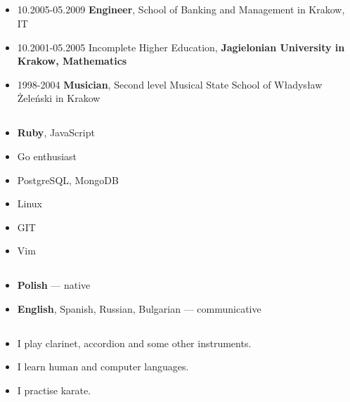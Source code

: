 \documentclass[a4paper]{article}
\begin{document}
\subsection*{}
\begin{itemize}
  \item
    10.2005-05.2009 \textbf{Engineer}, School of Banking and Management in Krakow, IT

  \item
    10.2001-05.2005 Incomplete Higher Education,
    \textbf{Jagielonian University in Krakow, Mathematics}

  \item
    1998-2004 \textbf{Musician},
    Second level Musical State School of Władysław Żeleński in Krakow
\end{itemize}

\subsection*{}
\begin{itemize}
\item
  \textbf{Ruby}, JavaScript
\item
  Go enthusiast
\item
  PostgreSQL, MongoDB
\item
  Linux
\item
  GIT
\item
  Vim
\end{itemize}

\subsection*{}
\begin{itemize}
\item
  \textbf{Polish} --- native
\item
  \textbf{English}, Spanish, Russian, Bulgarian --- communicative
\end{itemize}

\subsection*{}
\begin{itemize}
\item
	I play clarinet, accordion and some other instruments.
\item
  I learn human and computer languages.
\item
  I practise karate.
\end{itemize}
\end{document}
